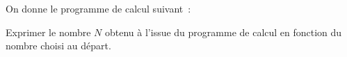 \documentclass[exercice]{thedocument}%
\begin{document}
%
On donne le programme de calcul suivant~:\par\medskip\noindent
{\centering{}\par\medskip}\noindent
Exprimer le nombre $N$ obtenu à l'issue du programme de calcul en fonction du nombre choisi
au départ.
\end{document}
